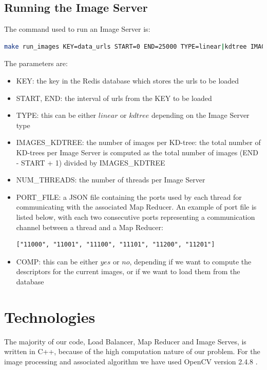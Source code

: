 \subsection{Running the Image Server}

The command used to run an Image Server is:

\begin{lstlisting}[language=bash]
make run_images KEY=data_urls START=0 END=25000 TYPE=linear|kdtree IMAGES_KDTREE=2500 NUM_THREADS=1 PORT_FILE=port_file.json COMP=yes|no
\end{lstlisting}

The parameters are:
\begin{itemize}
	\item KEY: the key in the Redis database which stores the urls to be loaded
	\item START, END: the interval of urls from the KEY to be loaded
	\item TYPE: this can be either $linear$ or $kdtree$ depending on the Image Server type
	\item IMAGES_KDTREE: the number of images per KD-tree: the total number of KD-trees per Image Server is computed as the total number of images (END - START + 1) divided by IMAGES_KDTREE
	\item NUM_THREADS: the number of threads per Image Server
	\item PORT_FILE: a JSON file containing the ports used by each thread for communicating with the associated Map Reducer. An example of port file is listed below, with each two consecutive ports representing a communication channel between a thread and a Map Reducer:\\
\begin{lstlisting}[caption=port_file.json]
  ["11000", "11001", "11100", "11101", "11200", "11201"]
\end{lstlisting}
	\item COMP: this can be either $yes$ or $no$, depending if we want to compute the descriptors for the current images, or if we want to load them from the database
\end{itemize}

\section{Technologies}

The majority of our code, Load Balancer, Map Reducer and Image Serves, is written in C++, because of the high computation nature of our problem. For the image processing and associated algorithm we have used OpenCV version 2.4.8 \cite{opencv}.

